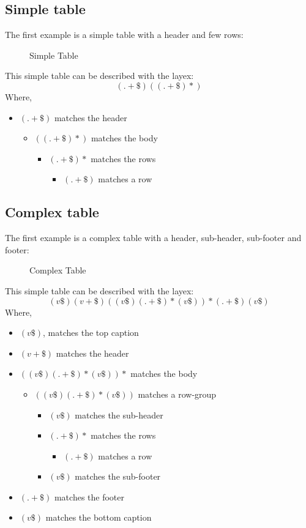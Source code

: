 \documentclass{article}
\begin{document}
\subsection{Simple table}
The first example is a simple table with a header and few rows:
\begin{figure}[H]
\caption{Simple Table}

\end{figure}
This simple table can be described with the layex:
\[(.+\$)((.+\$)*)\]
Where,
\begin{itemize}
    \item $(.+\$)$ matches the header
    \begin{itemize}
        \item $((.+\$)*)$ matches the body
        \begin{itemize}
            \item $(.+\$)*$ matches the rows
            \begin{itemize}
                \item $(.+\$)$ matches a row
            \end{itemize}
        \end{itemize}
    \end{itemize}
\end{itemize}

\subsection{Complex table}
The first example is a complex table with a header, sub-header, sub-footer and footer:
\begin{figure}[H]
\caption{Complex Table}

\end{figure}
This simple table can be described with the layex:
\[(v\$)(v+\$)((v\$)(.+\$)*(v\$))*(.+\$)(v\$)\]
Where,
\begin{itemize}
    \item $(v\$)$, matches the top caption
    \item $(v+\$)$ matches the header
    \item $((v\$)(.+\$)*(v\$))*$ matches the body
    \begin{itemize}
        \item $((v\$)(.+\$)*(v\$))$ matches a row-group
        \begin{itemize}
            \item $(v\$)$ matches the sub-header
            \item $(.+\$)*$ matches the rows
            \begin{itemize}
                \item $(.+\$)$ matches a row
            \end{itemize}
            \item $(v\$)$ matches the sub-footer
        \end{itemize}
    \end{itemize}
    \item $(.+\$)$ matches the footer
    \item $(v\$)$ matches the bottom caption
\end{itemize}
\end{document}
